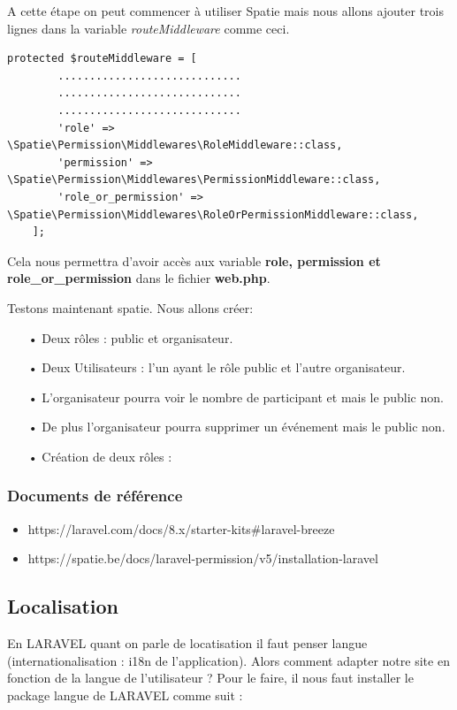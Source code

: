 \documentclass[12pt,a4paper]{article}
\begin{document}
A cette étape on peut commencer à utiliser Spatie mais nous allons ajouter trois lignes dans la variable \textit{routeMiddleware} comme ceci.
\begin{verbatim}
protected $routeMiddleware = [
        .............................
        .............................
        .............................
        'role' => \Spatie\Permission\Middlewares\RoleMiddleware::class,
        'permission' => \Spatie\Permission\Middlewares\PermissionMiddleware::class,
        'role_or_permission' => \Spatie\Permission\Middlewares\RoleOrPermissionMiddleware::class,
    ];
\end{verbatim}

Cela nous permettra d'avoir accès aux variable \textbf{role, permission et role\_or\_permission} dans le fichier \textbf{web.php}.

Testons maintenant spatie. Nous allons créer:
\begin{itemize}
\item[•]  Deux rôles : public et organisateur.
\item[•]  Deux Utilisateurs : l'un ayant le rôle public et l'autre organisateur.
\item[•]  L'organisateur pourra voir le nombre de participant et mais le public non.
\item[•] De plus l'organisateur pourra supprimer un événement mais le public non.
\end{itemize}

\begin{itemize}
\item[•] Création de deux rôles :

\end{itemize}

\subsubsection{Documents de référence}
\begin{itemize}
\item https://laravel.com/docs/8.x/starter-kits\#laravel-breeze
\item https://spatie.be/docs/laravel-permission/v5/installation-laravel
\end{itemize}


\subsection{Localisation}
En LARAVEL quant on parle de locatisation il faut penser langue (internationalisation : i18n de l'application).
Alors comment adapter notre site en fonction de la langue de l'utilisateur ? Pour le faire, il nous 
faut installer le package langue de LARAVEL comme suit :
\end{document}
